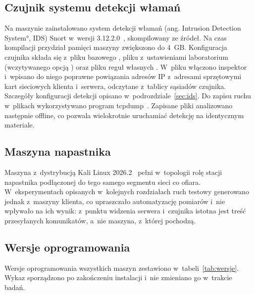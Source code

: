 \subsection{Czujnik systemu detekcji włamań}\label{sec:czujnik}

Na maszynie  zainstalowano system detekcji włamań (ang. \ang{Intrusion Detection System}, IDS) Snort w~wersji 3.12.2.0~\cite{snort3}, skompilowany ze źródeł. Na czas kompilacji przydział pamięci maszyny zwiększono do 4~GB. Konfiguracja czujnika składa się z~pliku bazowego , pliku z~ustawieniami laboratorium  (wczytywanego opcją ) oraz pliku reguł własnych . W~pliku  włączono inspektor  i~wpisano do niego poprawne powiązania adresów IP z~adresami sprzętowymi kart sieciowych klienta i~serwera, odczytane z~tablicy sąsiadów czujnika. Szczegóły konfiguracji detekcji opisano w~podrozdziale~\ref{sec:ids}. Do zapisu ruchu w~plikach  wykorzystywano program tcpdump~\cite{tcpdump}. Zapisane pliki analizowano następnie offline, co pozwala wielokrotnie uruchamiać detekcję na identycznym materiale.

\subsection{Maszyna napastnika}\label{sec:napastnik}

Maszyna  z~dystrybucją Kali Linux 2026.2~\cite{kali} pełni w~topologii rolę stacji napastnika podłączonej do tego samego segmentu sieci co ofiara. W~eksperymentach opisanych w~kolejnych rozdziałach ruch testowy generowano jednak z~maszyny klienta, co upraszczało automatyzację pomiarów i~nie wpływało na ich wynik: z~punktu widzenia serwera i~czujnika istotna jest treść przesyłanych komunikatów, a~nie maszyna, z~której pochodzą.

\subsection{Wersje oprogramowania}

Wersje oprogramowania wszystkich maszyn zestawiono w~tabeli~\ref{tab:wersje}. Wykaz sporządzono po zakończeniu instalacji i~nie zmieniano go w~trakcie badań.

